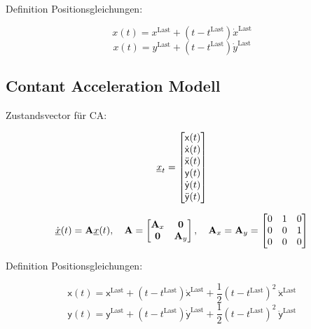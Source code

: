Definition Positionsgleichungen:

\begin{equation*}
    x(t) = x^{\text{Last}} + (t - t^{\text{Last}})\dot{x}^{\text{Last}}
\end{equation*}
\begin{equation*}
    x(t) = y^{\text{Last}} + (t - t^{\text{Last}})\dot{y}^{\text{Last}}
\end{equation*}



\subsection{Contant Acceleration Modell}

Zustandsvector für CA:

\begin{equation*} \label{eq:definitionCA}
    {\underline{x}}_t = 
    \begin{bmatrix}
        \mathsf{x}(t) \\
        \dot{\mathsf{x}}(t) \\
        \ddot{\mathsf{x}}(t) \\
        \mathsf{y}(t) \\
        \dot{\mathsf{y}}(t) \\
        \ddot{\mathsf{y}}(t)
       \end{bmatrix} 
\end{equation*}


\begin{align*} \label{eq:speedCV}
    \dot{{\underline{x}}}(t) = {{\mathbf{A}}}{\underline{x}}(t), \quad {\ensuremath{{\mathbf{A}}}} = 
    \begin{bmatrix}
        {\ensuremath{{\mathbf{A}}}}_x & \boldsymbol{0} \\
        \boldsymbol{0} & {{\mathbf{A}}}_y
    \end{bmatrix} 
    , \quad
    {\ensuremath{{\mathbf{A}}}}_x = {{\mathbf{A}}}_y = 
    \begin{bmatrix}
        0 & 1 & 0 \\
        0 & 0 & 1 \\
        0 & 0 & 0
    \end{bmatrix} 
\end{align*}

Definition Positionsgleichungen:

\begin{equation*}
    \mathsf{x}(t) = \mathsf{x}^{\text{Last}} + (t - t^{\text{Last}})\dot{\mathsf{x}}^{\text{Last}} 
    + \frac{1}{2} (t - t^{\text{Last}})^2 \: \ddot{\mathsf{x}}^{\text{Last}}
\end{equation*}
\begin{equation*}
    \mathsf{y}(t) = \mathsf{y}^{\text{Last}} + (t - t^{\text{Last}})\dot{\mathsf{y}}^{\text{Last}}
    + \frac{1}{2} (t - t^{\text{Last}})^2 \: \ddot{\mathsf{y}}^{\text{Last}}
\end{equation*}

